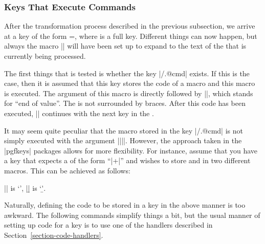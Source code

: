 \subsubsection{Keys That Execute Commands}
\label{section-key-code}

After the transformation process described in the previous subsection, we
arrive at a key of the form =, where  is a full
key. Different things can now happen, but always the macro |\pgfkeyscurrentkey|
will have been set up to expand to the text of the  that is currently
being processed.

The first things that is tested is whether the key |/.@cmd| exists.
If this is the case, then it is assumed that this key stores the code of a
macro and this macro is executed. The argument of this macro is 
directly followed by |\pgfeov|, which stands for ``end of value''. The
 is not surrounded by braces. After this code has been executed,
|\pgfkeys| continues with the next key in the .

It may seem quite peculiar that the macro stored in the key |/.@cmd|
is not simply executed with the argument |{||}|. However, the
approach taken in the |pgfkeys| packages allows for more flexibility. For
instance, assume that you have a key that expects a  of the form
``|+|'' and wishes to store  and
 in two different macros. This can be achieved as follows:
%
\begin{codeexample}[preamble={\usepackage{shortvrb} \MakeShortVerb{\|}}]
\def\mystore#1+#2\pgfeov{\def\a{#1}\def\b{#2}}

|\a| is `\a', |\b| is `\b'.
\end{codeexample}

Naturally, defining the code to be stored in a key in the above manner is too
awkward. The following commands simplify things a bit, but the usual manner of
setting up code for a key is to use one of the handlers described in
Section~\ref{section-code-handlers}.


